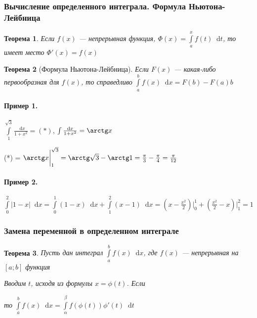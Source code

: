 \documentclass{article}
\newcommand*\diff{\mathop{}\!\mathrm{d}}
\newtheorem{theorem}{Теорема}
\begin{document}
\subsubsection{Вычисление определенного интеграла. Формула Ньютона-Лейбница}

\begin{theorem}
Если $f(x)$ — непрерывная функция, $\Phi(x) = \int\limits_a^x f(t) \diff t$, то имеет место $\Phi'(x) = f(x)$
\end{theorem}

\begin{theorem}[Формула Ньютона-Лейбница]
Если $F(x)$ — какая-либо первообразная для $f(x)$, то справедливо $\int\limits_{a}^{b} f(x) \diff x = F(b) - F(a)b$
\end{theorem}

\paragraph{Пример 1. } $\int\limits_1^{\sqrt{3}} \frac{\diff x}{1 + x^2} = (*)$, $\int \frac{\diff x}{1 + x^2} = \arctg x$

(*) = $\arctg x \bigg|_1^{\sqrt{3}} = \arctg \sqrt{3} - \arctg 1 = \frac{\pi}{3} - \frac{\pi}{4} = \frac{\pi}{12}$

\paragraph{Пример 2. } $\int\limits_0^2 |1 - x| \diff x = \int\limits_0^1 (1 - x) \diff x + \int\limits_1^2 (x - 1) \diff x = (x - \frac{x^2}{2}) \bigg|_{0}^{1} + (\frac{x^2}{2} - x) \bigg|_{1}^{2} = 1$

\subsubsection{Замена переменной в определенном интеграле}

\begin{theorem}
Пусть дан интеграл $\int\limits_{a}^{b} f(x) \diff x$, где $f(x)$ — непрерывная на $[a; b]$ функция

Вводим $t$, исходя из формулы $x = \phi(t)$. Если

\begin{multienumerate}
\end{multienumerate}

то $\int\limits_{a}^{b} f(x) \diff x = \int\limits_{\alpha}^{\beta} f(\phi(t)) \phi'(t) \diff t$
\end{theorem}
\end{document}
